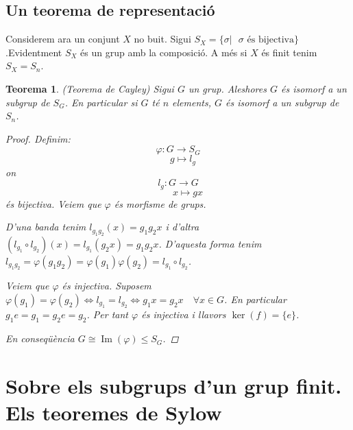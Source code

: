\documentclass[a4paper,11pt]{report}
\renewcommand{\implies}{\Leftrightarrow}
\theoremstyle{theorem}
\newtheorem{teorema}{\normalfont \sffamily\bfseries Teorema}[section]
\theoremstyle{definition}
\DeclareMathOperator{\ima}{Im}
\begin{document}
\subsection{Un teorema de representació}
Considerem ara un conjunt $X$ no buit. Sigui $S_X=\{\sigma|\text{ }\sigma \text{ és bijectiva}\}$.Evidentment $S_X$ és un grup amb la composició. A més si $X$ és finit tenim $S_X=S_n$.
\begin{teorema}{(Teorema de Cayley)}
	Sigui $G$ un grup. Aleshores $G$ és isomorf a un subgrup de $S_G$. En particular si $G$ té $n$ elements, $G$ és isomorf a un subgrup de $S_n$.
	\begin{proof}
	Definim:
	$$\varphi:G\longrightarrow S_G$$ $$\quad g\longmapsto l_g$$ on $$l_g:G\longrightarrow G$$
	$$\qquad x\longmapsto gx$$ és bijectiva. Veiem que $\varphi$ és morfisme de grups.
	
	D'una banda tenim $l_{g_1g_2}(x)=g_1g_2x$ i d'altra $(l_{g_1}\circ l_{g_2})(x)=l_{g_1}(g_2x)=g_1g_2x$. D'aquesta forma tenim $l_{g_1g_2}=\varphi(g_1 g_2)=\varphi(g_1)\varphi(g_2)=l_{g_1}\circ l_{g_2}$.
	
	Veiem que $\varphi$ és injectiva. Suposem $\varphi(g_1)=\varphi(g_2)\implies l_{g_1}=l_{g_2}\implies g_1x=g_2x \quad \forall x\in G$. En particular $g_1 e=g_1=g_2e=g_2$. Per tant $\varphi$ és injectiva i llavors $\ker(f)=\{e\}$.
	
	En conseqüència $G\cong \ima(\varphi)\leq S_G$.
	\end{proof}
\end{teorema}
\section{Sobre els subgrups d'un grup finit. Els teoremes de Sylow}
\end{document}
